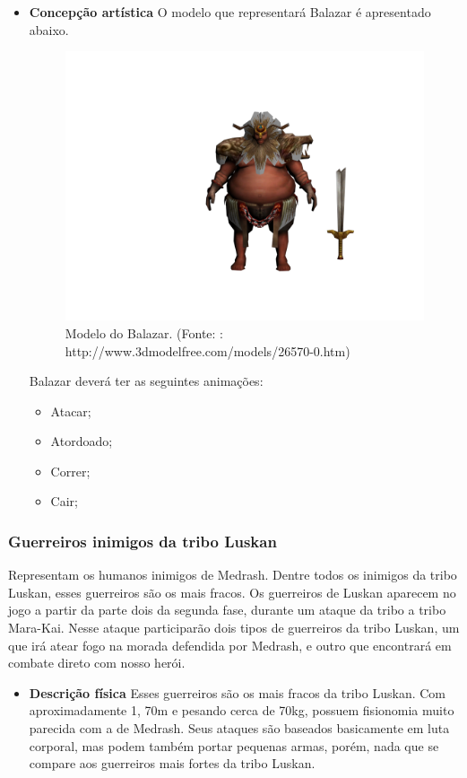 \begin{itemize}
\item{\bf Concepção artística} O modelo que representará Balazar é apresentado abaixo.
 \begin{figure}[ht]
 \centering
 \includegraphics[scale=0.33]{Imagens/inimigo01.png}
 \caption{Modelo do Balazar. (Fonte: : http://www.3dmodelfree.com/models/26570-0.htm)}
\label{img:balazar}
\end{figure}

Balazar deverá ter as seguintes animações: 
\begin{itemize}
\item {Atacar;}
\item {Atordoado;}
\item {Correr;}
\item {Cair;}
\end{itemize}
\end{itemize}
\subsubsection{Guerreiros inimigos da tribo Luskan}
Representam os humanos inimigos de Medrash. Dentre todos os inimigos da tribo Luskan, esses guerreiros são os mais fracos. Os guerreiros de Luskan aparecem no jogo a partir da parte dois da segunda fase, durante um ataque da tribo a tribo Mara-Kai. Nesse ataque participarão dois tipos de guerreiros da tribo Luskan, um que irá atear fogo na morada defendida por Medrash, e outro que encontrará em combate direto com nosso herói.

\begin{itemize}
\item{\bf Descrição física}
Esses guerreiros são os mais fracos da tribo Luskan. Com aproximadamente 1, 70m e pesando cerca de 70kg, possuem fisionomia muito parecida com a de Medrash. Seus ataques são baseados basicamente em luta corporal, mas podem também portar pequenas armas, porém, nada que se compare aos guerreiros mais fortes da tribo Luskan.
\end{itemize}

